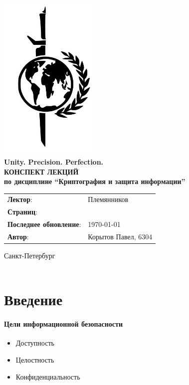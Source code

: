 \documentclass[a4paper, 14pt]{extarticle}
\begin{document}
\begin{titlepage}
    {\centering
        {\bfseries
            \includegraphics[height=8cm]{logo.jpeg}\\
            Unity. Precision. Perfection.\\
            \vspace{3.5cm}
            \uppercase{Конспект лекций} \\
            по дисциплине \enquote{Криптография и защита информации}\\
        }
        \vspace{\fill}
    }
    \begin{tabular}{l l}
        \textbf{Лектор}: & Племянников\\
        \textbf{Страниц}: &\pageref{LastPage}\\
        \textbf{Последнее обновление}: & \today{}\\ 
        \textbf{Автор}: & Корытов Павел, 6304\\
    \end{tabular}

    \vspace{2cm}
    {\centering
        Санкт-Петербург \\
        \the\year\\
    }
\end{titlepage}

\tableofcontents
\newpage

\section{Введение}
\paragraph{Цели информационной безопасности}
\begin{itemize}
    \item Доступность
    \item Целостность
    \item Конфиденциальность
\end{itemize}
\end{document}
